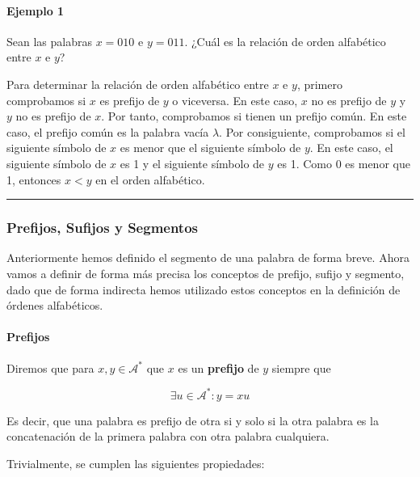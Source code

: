 \paragraph{Ejemplo 1}\label{ejemplo-1-1}

Sean las palabras \(x=010\) e \(y=011\). ¿Cuál es la relación de orden
alfabético entre \(x\) e \(y\)?

Para determinar la relación de orden alfabético entre \(x\) e \(y\),
primero comprobamos si \(x\) es prefijo de \(y\) o viceversa. En este
caso, \(x\) no es prefijo de \(y\) y \(y\) no es prefijo de \(x\). Por
tanto, comprobamos si tienen un prefijo común. En este caso, el prefijo
común es la palabra vacía \(\lambda\). Por consiguiente, comprobamos si
el siguiente símbolo de \(x\) es menor que el siguiente símbolo de
\(y\). En este caso, el siguiente símbolo de \(x\) es 1 y el siguiente
símbolo de \(y\) es 1. Como 0 es menor que 1, entonces \(x < y\) en el
orden alfabético.

\begin{center}\rule{0.5\linewidth}{0.5pt}\end{center}

\subsubsection{Prefijos, Sufijos y
Segmentos}\label{prefijos-sufijos-y-segmentos}

Anteriormente hemos definido el segmento de una palabra de forma breve.
Ahora vamos a definir de forma más precisa los conceptos de prefijo,
sufijo y segmento, dado que de forma indirecta hemos utilizado estos
conceptos en la definición de órdenes alfabéticos.

\paragraph{Prefijos}\label{prefijos}

Diremos que para \(x,y\in\mathcal{A}^*\) que \(x\) es un
\textbf{prefijo} de \(y\) siempre que

\[
\exists u\in\mathcal{A}^*:y=xu
\]

Es decir, que una palabra es prefijo de otra si y solo si la otra
palabra es la concatenación de la primera palabra con otra palabra
cualquiera.

Trivialmente, se cumplen las siguientes propiedades:

